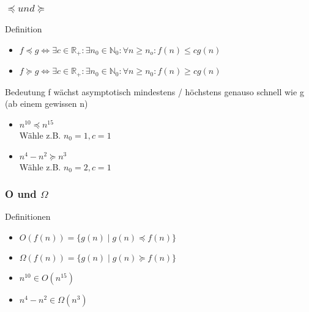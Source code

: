\documentclass{beamer}
\begin{document}
\begin{frame}
	\frametitle{$\preceq und \succeq$ }
	\begin{block}{Definition}
		\begin{itemize}
			\item $f \preceq g \Leftrightarrow \exists c \in \mathbb R_+ : \exists n_0 \in \mathbb N_0 :
				 \forall n \ge n_o :  f(n) \le cg(n)$
			\item $f \succeq g \Leftrightarrow \exists c \in \mathbb R_+ : \exists n_0 \in \mathbb N_0 :
				 \forall n \ge n_0 : f(n) \ge cg(n)$
		\end{itemize}
	\end{block}
	\begin{block}{Bedeutung}
		f w\"achst asymptotisch mindestens / h\"ochstens genauso schnell wie g \\
		(ab einem gewissen n)
	\end{block}
	\begin{example}
		\begin{itemize}
			\item $n^{10} \preceq n^{15}$ \\
				W\"ahle z.B. $n_0 = 1, c = 1$
			\item $n^4 - n^2 \succeq n^3$ \\
				W\"ahle z.B. $n_0 = 2, c = 1$
		\end{itemize}
	\end{example}
\end{frame}

\begin{frame}
	\frametitle{O und $\Omega$}
	\begin{block}{Definitionen}
		\begin{itemize}
			\item $O(f(n)) = \{g(n) \mid g(n) \preceq f(n)\}$
			\item $\Omega(f(n)) = \{g(n) \mid g(n) \succeq f(n)\}$
		\end{itemize}
	\end{block}
	\begin{example}
		\begin{itemize}
			\item $n^{10} \in O(n^{15})$
			\item $n^4 - n^2 \in \Omega(n^3)$
		\end{itemize}
	\end{example}
\end{frame}
\end{document}
